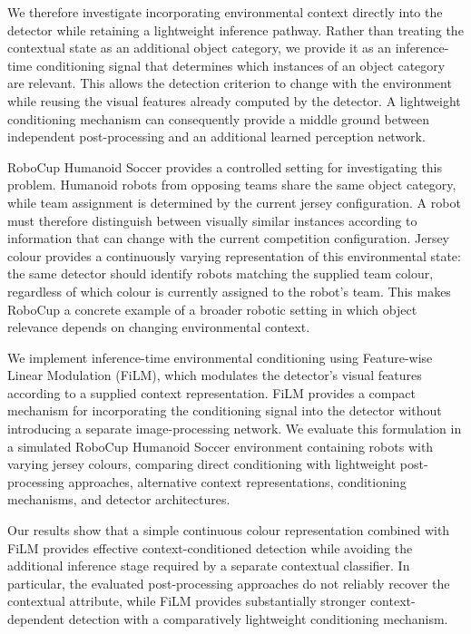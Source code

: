 \documentclass{article}
\begin{document}
We therefore investigate incorporating environmental context directly into the detector while retaining a lightweight inference pathway. Rather than treating the contextual state as an additional object category, we provide it as an inference-time conditioning signal that determines which instances of an object category are relevant. This allows the detection criterion to change with the environment while reusing the visual features already computed by the detector. A lightweight conditioning mechanism can consequently provide a middle ground between independent post-processing and an additional learned perception network.

RoboCup Humanoid Soccer provides a controlled setting for investigating this problem. Humanoid robots from opposing teams share the same object category, while team assignment is determined by the current jersey configuration. A robot must therefore distinguish between visually similar instances according to information that can change with the current competition configuration. Jersey colour provides a continuously varying representation of this environmental state: the same detector should identify robots matching the supplied team colour, regardless of which colour is currently assigned to the robot's team. This makes RoboCup a concrete example of a broader robotic setting in which object relevance depends on changing environmental context.

We implement inference-time environmental conditioning using Feature-wise Linear Modulation (FiLM), which modulates the detector's visual features according to a supplied context representation. FiLM provides a compact mechanism for incorporating the conditioning signal into the detector without introducing a separate image-processing network. We evaluate this formulation in a simulated RoboCup Humanoid Soccer environment containing robots with varying jersey colours, comparing direct conditioning with lightweight post-processing approaches, alternative context representations, conditioning mechanisms, and detector architectures.

Our results show that a simple continuous colour representation combined with FiLM provides effective context-conditioned detection while avoiding the additional inference stage required by a separate contextual classifier. In particular, the evaluated post-processing approaches do not reliably recover the contextual attribute, while FiLM provides substantially stronger context-dependent detection with a comparatively lightweight conditioning mechanism.
\end{document}
